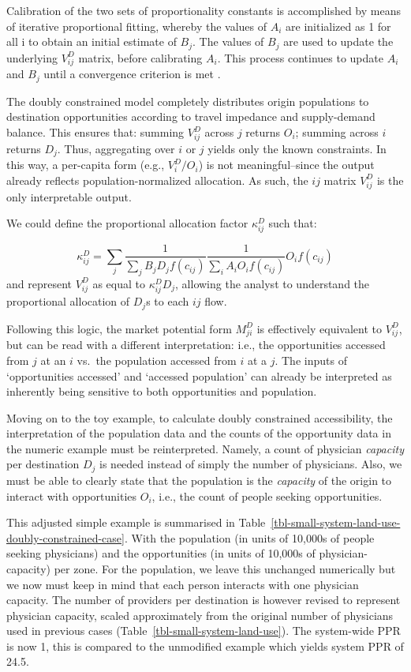 \documentclass[
  10pt,
  letterpaper,
]{article}
\begin{document}
Calibration of the two sets of proportionality constants is accomplished
by means of iterative proportional fitting, whereby the values of
\(A_i\) are initialized as 1 for all i to obtain an initial estimate of
\(B_j\). The values of \(B_j\) are used to update the underlying
\(V_{ij}^D\) matrix, before calibrating \(A_i\). This process continues
to update \(A_i\) and \(B_j\) until a convergence criterion is met
\citep[see][p.~193-195]{ortuzar_2011_modelling}.

The doubly constrained model completely distributes origin populations
to destination opportunities according to travel impedance and
supply-demand balance. This ensures that: summing \(V^D_{ij}\) across
\(j\) returns \(O_i\); summing across \(i\) returns \(D_j\). Thus,
aggregating over \(i\) or \(j\) yields only the known constraints. In
this way, a per-capita form (e.g., \(V^D_i / O_i\)) is not
meaningful--since the output already reflects population-normalized
allocation. As such, the \(ij\) matrix \(V^D_{ij}\) is the only
interpretable output.

We could define the proportional allocation factor \(\kappa_{ij}^D\)
such that:

\[
\kappa_{ij}^D = \sum_j \frac{1}{\sum_j B_j D_j f(c_{ij})} \frac{1}{\sum_i A_i O_i f(c_{ij})} O_i f(c_{ij})
\] \noindent and represent \(V^D_{ij}\) as equal to
\(\kappa^D_{ij} D_j\), allowing the analyst to understand the
proportional allocation of \(D_j\)s to each \(ij\) flow.

Following this logic, the market potential form \(M^D_{ji}\) is
effectively equivalent to \(V_{ij}^D\), but can be read with a different
interpretation: i.e., the opportunities accessed from \(j\) at an \(i\)
vs.~the population accessed from \(i\) at a \(j\). The inputs of
`opportunities accessed' and `accessed population' can already be
interpreted as inherently being sensitive to both opportunities and
population.

Moving on to the toy example, to calculate doubly constrained
accessibility, the interpretation of the population data and the counts
of the opportunity data in the numeric example must be reinterpreted.
Namely, a count of physician \emph{capacity} per destination \(D_j\) is
needed instead of simply the number of physicians. Also, we must be able
to clearly state that the population is the \emph{capacity} of the
origin to interact with opportunities \(O_i\), i.e., the count of people
seeking opportunities.

This adjusted simple example is summarised in
Table~\ref{tbl-small-system-land-use-doubly-constrained-case}. With the
population (in units of 10,000s of people seeking physicians) and the
opportunities (in units of 10,000s of physician-capacity) per zone. For
the population, we leave this unchanged numerically but we now must keep
in mind that each person interacts with one physician capacity. The
number of providers per destination is however revised to represent
physician capacity, scaled approximately from the original number of
physicians used in previous cases
(Table~\ref{tbl-small-system-land-use}). The system-wide PPR is now 1,
this is compared to the unmodified example which yields system PPR of
24.5.
\end{document}

